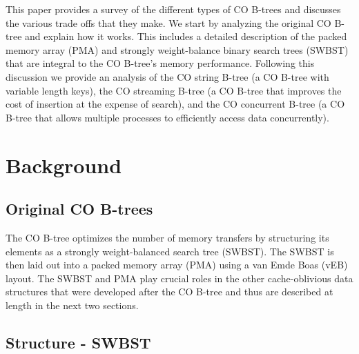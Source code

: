 \documentclass[preprint]{style}
\begin{document}
This paper provides a survey of the different types of CO B-trees and discusses
the various trade offs that they make. We start by analyzing the original CO
B-tree and explain how it works. This includes a detailed description of the
packed memory array (PMA) and strongly weight-balance binary search trees
(SWBST) that are integral to the CO B-tree's memory performance. Following this
discussion we provide an analysis of the CO string B-tree (a CO B-tree with
variable length keys), the CO streaming B-tree (a CO B-tree that improves the
cost of insertion at the expense of search), and the CO concurrent B-tree (a CO
B-tree that allows multiple processes to efficiently access data concurrently).

\section{Background}

\subsection{Original CO B-trees}
\label{sec:original}

The CO B-tree optimizes the number of memory transfers by structuring its
elements as a strongly weight-balanced search tree (SWBST). The SWBST is then
laid out into a packed memory array (PMA) using a van Emde Boas (vEB) layout.
The SWBST and PMA play crucial roles in the other cache-oblivious data
structures that were developed after the CO B-tree and thus are described at
length in the next two sections.

\subsection{Structure - SWBST}
\label{sec:structure}
\end{document}
